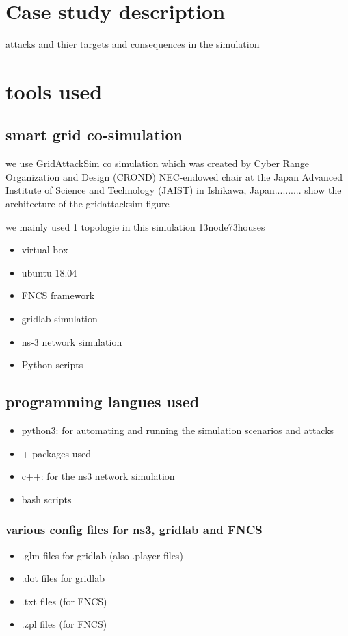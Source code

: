 \section{Case study description}
attacks and thier targets and consequences in the simulation



\section{tools used}

\subsection{smart grid co-simulation}
we use GridAttackSim co simulation which was created by Cyber Range Organization and Design (CROND) NEC-endowed chair at the Japan Advanced Institute of Science and Technology (JAIST) in Ishikawa, Japan..........
show the architecture of the gridattacksim figure

we mainly used 1 topologie in this simulation 13node73houses
\firmlist
\begin{itemize}
	\item virtual box
	\item ubuntu 18.04
	\item FNCS framework
	\item gridlab simulation
	\item ns-3 network simulation
	\item Python scripts
\end{itemize}

\subsection{programming langues used}
\begin{itemize}
	\item python3: for automating and running the simulation scenarios and attacks
	\item + packages used
	\item c++: for the ns3 network simulation 
	\item bash scripts
\end{itemize}


\subsubsection{various config files for ns3, gridlab and FNCS}
\begin{itemize}
	\item .glm files for gridlab (also .player files)
	\item .dot files for gridlab
	\item .txt files (for FNCS) 
	\item .zpl files (for FNCS) 
\end{itemize}



